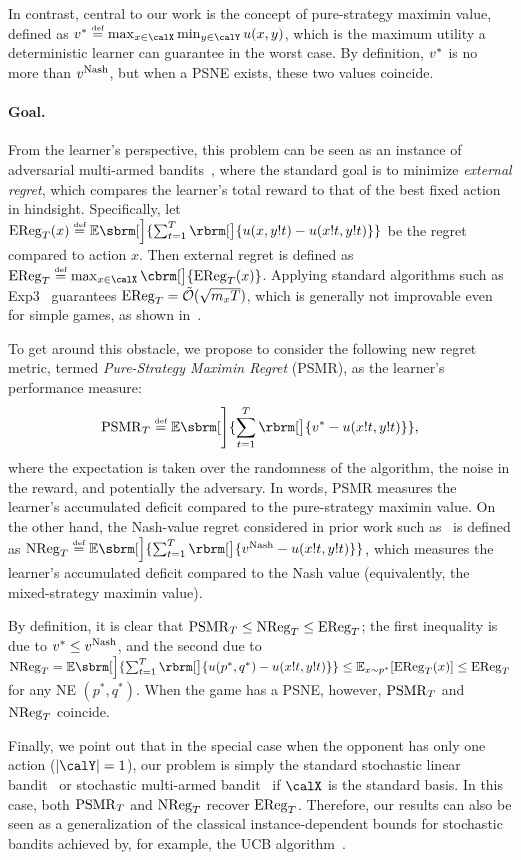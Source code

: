 In contrast, central to our work is the concept of pure-strategy maximin value, defined as $\vStar\defeq \max_{x\in \calX} \min_{y\in \calY} u(x,y)$, which is the maximum utility a deterministic learner can guarantee in the worst case.
By definition, $v^*$ is no more than $v^{\mathrm{Nash}}$, but when a PSNE exists, these two values coincide.

\paragraph{Goal.}
From the learner's perspective, this problem can be seen as an instance of adversarial multi-armed bandits~\citep{auer2002nonstochastic}, where the standard goal is to minimize \textit{external regret}, which compares the learner's total reward to that of the best fixed action in hindsight.
Specifically, let $\ER_T(x) \defeq \EE\sbrm[\Big]{\sum_{t=1}^T \rbrm[\big]{u(x,y!t)-u(x!t,y!t)}}$ be the regret compared to action $x$.
Then external regret is defined as
$\ER_T \defeq \max_{x\in \calX} \cbrm[\big]{\ER_T(x)}$.
Applying standard algorithms such as Exp3~\citep{auer2002nonstochastic} guarantees $\mathrm{EReg}_T = \tilde{\mathcal{O}}(\sqrt{m_xT})$, which is generally not improvable even for simple games, as shown in~\citet[Theorem~3]{maiti2025limitations}.

To get around this obstacle,
we propose to consider the following new regret metric, termed \emph{Pure-Strategy Maximin Regret} (PSMR), as the learner's performance measure:
\begin{equation}
    \psmr_T\defeq \EE\sbrm[\Bigg]{\sum_{t=1}^T \rbrm[\big]{\vStar-u(x!t,y!t)}},
    \label{eq:psmr-def}
\end{equation}
where the expectation is taken over the randomness of the algorithm, the noise in the reward, and potentially the adversary.
In words, PSMR measures the learner's accumulated deficit compared to the pure-strategy maximin value.
On the other hand, the Nash-value regret considered in prior work such as~\citet{odonoghue2021matrix, maiti2025limitations} is defined as $\NR_T \defeq\EE\sbrm[\Big]{\sum_{t=1}^T \rbrm[\big]{\vMix-u(x!t,y!t)}}$, which measures the learner's accumulated deficit compared to the Nash value (equivalently, the mixed-strategy maximin value).

By definition, it is clear that $\mathrm{PSMR}_T \leq \mathrm{NReg}_T \leq \mathrm{EReg}_T$; the first inequality is due to $v^*\leq v^{\mathrm{Nash}}$, and the second due to $\NR_T=\EE\sbrm[\Big]{\sum_{t=1}^T \rbrm[\big]{u(p^*, q^*)-u(x!t,y!t)}}\leq\EE_{x\sim p^*}[\ER_T(x)]\leq \ER_T$ for any NE $(p^*,q^*)$.
When the game has a PSNE, however, $\mathrm{PSMR}_T$ and $\mathrm{NReg}_T$ coincide. 

Finally, we point out that in the special case when the opponent has only one action ($|\calY|=1$), our problem is simply the standard stochastic linear bandit~\citep{abbasi-yadkori2011improved} or
stochastic multi-armed bandit~\citep{lai1985asymptotically} if $\calX$ is the standard basis.
In this case,
both $\mathrm{PSMR}_T$ and $\mathrm{NReg}_T$ recover $\mathrm{EReg}_T$.
Therefore, our results can also be seen as a generalization of the classical instance-dependent bounds for stochastic bandits achieved by, for example, the UCB algorithm~\citep{auer2002using}.


